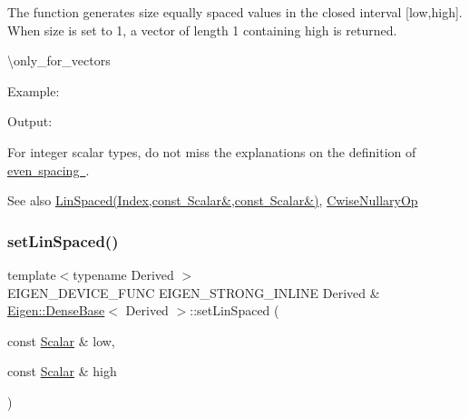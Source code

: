 The function generates \textquotesingle{}size\textquotesingle{} equally spaced values in the closed interval \mbox{[}low,high\mbox{]}. When size is set to 1, a vector of length 1 containing \textquotesingle{}high\textquotesingle{} is returned.

\textbackslash{}only\+\_\+for\+\_\+vectors

Example\+: 
\begin{DoxyCodeInclude}{0}
\end{DoxyCodeInclude}
 Output\+: 
\begin{DoxyVerbInclude}
\end{DoxyVerbInclude}


For integer scalar types, do not miss the explanations on the definition of \mbox{\hyperlink{class_eigen_1_1_dense_base_a513c7986f48517c36f992a558f81e591}{even spacing }}.

\begin{DoxySeeAlso}{See also}
\mbox{\hyperlink{class_eigen_1_1_dense_base_a513c7986f48517c36f992a558f81e591}{Lin\+Spaced(\+Index,const Scalar\&,const Scalar\&)}}, \mbox{\hyperlink{class_eigen_1_1_cwise_nullary_op}{Cwise\+Nullary\+Op}} 
\end{DoxySeeAlso}
\mbox{\label{class_eigen_1_1_dense_base_a99dd31774d69545aba5d4f598cd27c4b}} 
\subsubsection{\texorpdfstring{setLinSpaced()}{setLinSpaced()}\hspace{0.1cm}{\footnotesize\ttfamily [2/2]}}
{\footnotesize\ttfamily template$<$typename Derived $>$ \\
E\+I\+G\+E\+N\+\_\+\+D\+E\+V\+I\+C\+E\+\_\+\+F\+U\+NC E\+I\+G\+E\+N\+\_\+\+S\+T\+R\+O\+N\+G\+\_\+\+I\+N\+L\+I\+NE Derived \& \mbox{\hyperlink{class_eigen_1_1_dense_base}{Eigen\+::\+Dense\+Base}}$<$ Derived $>$\+::set\+Lin\+Spaced (\begin{DoxyParamCaption}\item[{const \mbox{\hyperlink{class_eigen_1_1_dense_base_a5feed465b3a8e60c47e73ecce83e39a2}{Scalar}} \&}]{low,  }\item[{const \mbox{\hyperlink{class_eigen_1_1_dense_base_a5feed465b3a8e60c47e73ecce83e39a2}{Scalar}} \&}]{high }\end{DoxyParamCaption})}



